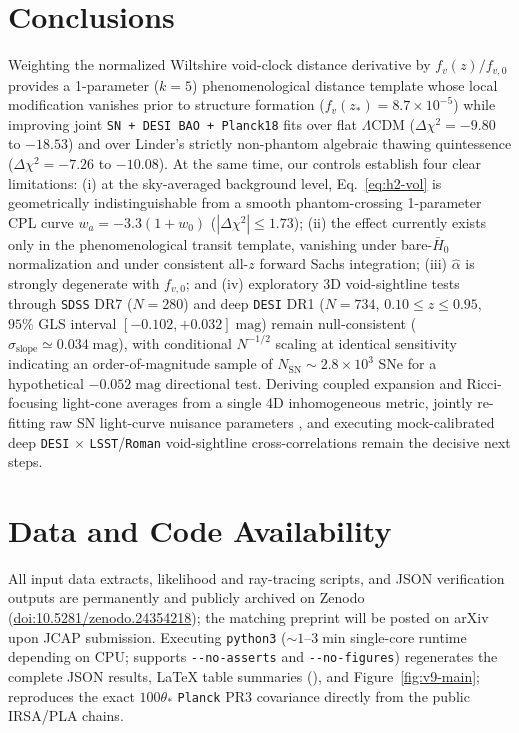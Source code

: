 \documentclass[11pt,a4paper]{article}
\begin{document}
\section{Conclusions}
Weighting the normalized Wiltshire void-clock distance derivative by $f_v(z)/f_{v,0}$ provides a 1-parameter ($k = 5$) phenomenological distance template whose local modification vanishes prior to structure formation ($f_v(z_*) = 8.7\times 10^{-5}$) while improving joint \texttt{SN + DESI BAO + Planck18} fits over flat $\Lambda$CDM ($\Delta\chi^2 = -9.80$ to $-18.53$) and over Linder's strictly non-phantom algebraic thawing quintessence ($\Delta\chi^2 = -7.26$ to $-10.08$). At the same time, our controls establish four clear limitations: (i) at the sky-averaged background level, Eq.~\eqref{eq:h2-vol} is geometrically indistinguishable from a smooth phantom-crossing 1-parameter CPL curve $w_a = -3.3(1+w_0)$ ($|\Delta\chi^2| \le 1.73$); (ii) the effect currently exists only in the phenomenological transit template, vanishing under bare-$\bar{H}_0$ normalization and under consistent all-$z$ forward Sachs integration; (iii) $\hat{\alpha}$ is strongly degenerate with $f_{v,0}$; and (iv) exploratory 3D void-sightline tests through \texttt{SDSS} DR7 ($N = 280$) and deep \texttt{DESI} DR1 ($N = 734$, $0.10 \le z \le 0.95$, $95\%$ GLS interval $[-0.102, +0.032]\;\mathrm{mag}$) remain null-consistent ($\sigma_{\mathrm{slope}} \simeq 0.034\;\mathrm{mag}$), with conditional $N^{-1/2}$ scaling at identical sensitivity indicating an order-of-magnitude sample of $N_{\mathrm{SN}} \sim 2.8 \times 10^3$ SNe for a hypothetical $-0.052\;\mathrm{mag}$ directional test. Deriving coupled expansion and Ricci-focusing light-cone averages from a single 4D inhomogeneous metric, jointly re-fitting raw SN light-curve nuisance parameters \cite{LaneWiltshire2025MNRAS,SeifertWiltshire2025MNRAS}, and executing mock-calibrated deep \texttt{DESI} $\times$ \texttt{LSST}/\texttt{Roman} void-sightline cross-correlations remain the decisive next steps.

\section*{Data and Code Availability}
{\sloppy All input data extracts, likelihood and ray-tracing scripts, and JSON verification outputs are permanently and publicly archived on Zenodo (\href{https://doi.org/10.5281/zenodo.24354218}{doi:10.5281/zenodo.24354218}); the matching preprint will be posted on arXiv upon JCAP submission. Executing \texttt{python3}  ($\sim 1\text{--}3\;\mathrm{min}$ single-core runtime depending on CPU; supports \texttt{-{}-no-asserts} and \texttt{-{}-no-figures}) regenerates the complete JSON results, LaTeX table summaries (), and Figure~\ref{fig:v9-main};  reproduces the exact $100\theta_*$ \texttt{Planck} PR3 covariance directly from the public IRSA/PLA chains.\par}
\end{document}
